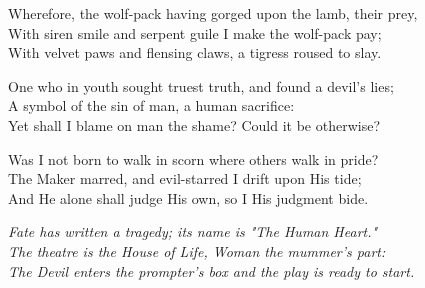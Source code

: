 \begin{poemblock}
Wherefore, the wolf-pack having gorged upon the lamb, their prey,\\
With siren smile and serpent guile I make the wolf-pack pay;\\
With velvet paws and flensing claws, a tigress roused to slay.

One who in youth sought truest truth, and found a devil's lies;\\
A symbol of the sin of man, a human sacrifice:\\
Yet shall I blame on man the shame? Could it be otherwise?

Was I not born to walk in scorn where others walk in pride?\\
The Maker marred, and evil-starred I drift upon His tide;\\
And He alone shall judge His own, so I His judgment bide.

\textit{
Fate has written a tragedy; its name is "The Human Heart."\\
The theatre is the House of Life, Woman the mummer's part:\\
The Devil enters the prompter's box and the play is ready to start.
}
\end{poemblock}
